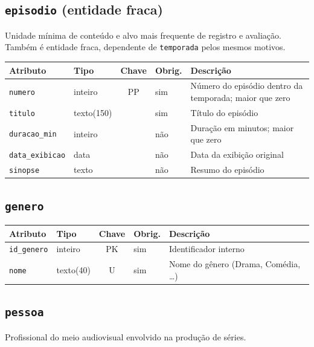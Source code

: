 \documentclass[a4paper,12pt,oneside,openany]{book}
\newcommand{\id}[1]{\texttt{#1}}
\begin{document}
\subsection{\id{episodio} (entidade fraca)}

Unidade mínima de conteúdo e alvo mais frequente de registro e avaliação. Também é
entidade fraca, dependente de \id{temporada} pelos mesmos motivos.

\begin{table}[H]
\centering
\small
\begin{tabularx}{\textwidth}{@{}llclX@{}}
\toprule
\textbf{Atributo} & \textbf{Tipo} & \textbf{Chave} & \textbf{Obrig.} & \textbf{Descrição} \\
\midrule
\id{numero} & inteiro & PP & sim & Número do episódio dentro da temporada; maior que zero \\
\id{titulo} & texto(150) & & sim & Título do episódio \\
\id{duracao\_min} & inteiro & & não & Duração em minutos; maior que zero \\
\id{data\_exibicao} & data & & não & Data da exibição original \\
\id{sinopse} & texto & & não & Resumo do episódio \\
\bottomrule
\end{tabularx}
\end{table}

\subsection{\id{genero}}

\begin{table}[H]
\centering
\small
\begin{tabularx}{\textwidth}{@{}llclX@{}}
\toprule
\textbf{Atributo} & \textbf{Tipo} & \textbf{Chave} & \textbf{Obrig.} & \textbf{Descrição} \\
\midrule
\id{id\_genero} & inteiro & PK & sim & Identificador interno \\
\id{nome} & texto(40) & U & sim & Nome do gênero (Drama, Comédia, \dots) \\
\bottomrule
\end{tabularx}
\end{table}

\subsection{\id{pessoa}}

Profissional do meio audiovisual envolvido na produção de séries.
\end{document}
